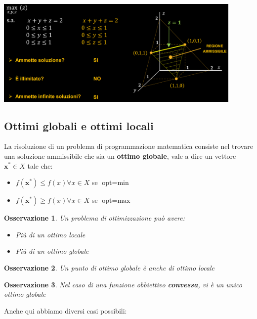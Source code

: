 \documentclass[12pt]{article}
\newtheorem{Osservazione}{Osservazione}[subsection]
\begin{document}
\begin{center}
    \includegraphics[width = 0.90\textwidth]{Images/6.PNG}
\end{center}
\subsection{Ottimi globali e ottimi locali}
La risoluzione di un problema di programmazione matematica consiste nel trovare una soluzione ammissibile che sia un \textbf{ottimo globale},
vale a dire un vettore $\textbf{x}^* \in X$ tale che:
\begin{itemize}
    \item $f(\textbf{x}^*) \leq f(x) \forall x \in X$ se $\textrm{opt} = \textrm{min}$
    \item $f(\textbf{x}^*) \geq f(x) \forall x \in X$ se $\textrm{opt} = \textrm{max}$
\end{itemize}
\begin{Osservazione}
    Un problema di ottimizzazione può avere:
    \begin{itemize}
        \item Più di un ottimo locale
        \item Più di un ottimo globale
    \end{itemize}
\end{Osservazione}
\begin{Osservazione}
    Un punto di ottimo globale è anche di ottimo locale
\end{Osservazione}
\begin{Osservazione}
    Nel caso di una funzione obbiettivo \textbf{convessa}, vi è un unico ottimo globale
\end{Osservazione}
Anche qui abbiamo diversi casi possibili:
\end{document}
